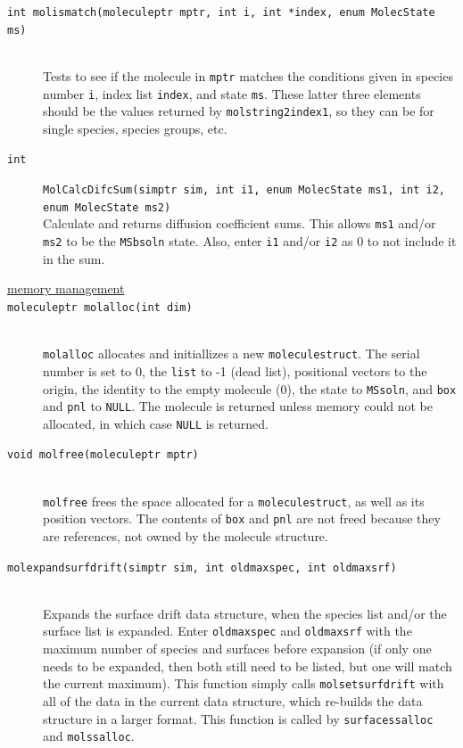\documentclass {scrbook}
\newcommand {\ttt} {\texttt}
\begin{document}
\begin{description}
\item[\ttt{int molismatch(moleculeptr mptr, int i, int *index, enum MolecState ms)}]
\hfill \\
Tests to see if the molecule in \ttt{mptr} matches the conditions given in species number \ttt{i}, index list \ttt{index}, and state \ttt{ms}. These latter three elements should be the values returned by \ttt{molstring2index1}, so they can be for single species, species groups, etc.

\item[\ttt{int}]
\ttt{MolCalcDifcSum(simptr sim, int i1, enum MolecState ms1, int i2, enum MolecState ms2)}
\hfill \\
Calculate and returns diffusion coefficient sums. This allows \ttt{ms1} and/or \ttt{ms2} to be the \ttt{MSbsoln} state. Also, enter \ttt{i1} and/or \ttt{i2} as 0 to not include it in the sum.

\item[\underline{memory management}]

\item[\ttt{moleculeptr molalloc(int dim)}]
\hfill \\
\ttt{molalloc} allocates and initiallizes a new \ttt{moleculestruct}. The serial number is set to 0, the \ttt{list} to -1 (dead list), positional vectors to the origin, the identity to the empty molecule (0), the state to \ttt{MSsoln}, and \ttt{box} and \ttt{pnl} to \ttt{NULL}. The molecule is returned unless memory could not be allocated, in which case \ttt{NULL} is returned.

\item[\ttt{void molfree(moleculeptr mptr)}]
\hfill \\
\ttt{molfree} frees the space allocated for a \ttt{moleculestruct}, as well as its position vectors. The contents of \ttt{box} and \ttt{pnl} are not freed because they are references, not owned by the molecule structure.

\item[\ttt{molexpandsurfdrift(simptr sim, int oldmaxspec, int oldmaxsrf)}]
\hfill \\
Expands the surface drift data structure, when the species list and/or the surface list is expanded. Enter \ttt{oldmaxspec} and \ttt{oldmaxsrf} with the maximum number of species and surfaces before expansion (if only one needs to be expanded, then both still need to be listed, but one will match the current maximum). This function simply calls \ttt{molsetsurfdrift} with all of the data in the current data structure, which re-builds the data structure in a larger format. This function is called by \ttt{surfacessalloc} and \ttt{molssalloc}.


\end{description}
\end{document}
